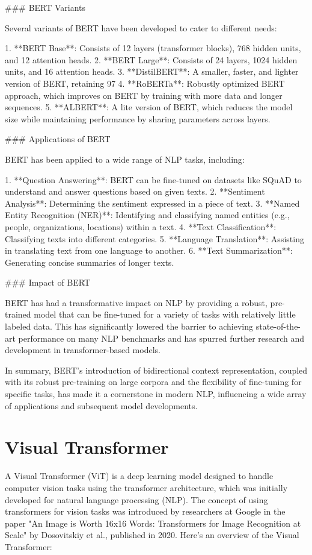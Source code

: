 ### BERT Variants

Several variants of BERT have been developed to cater to different needs:

1. **BERT Base**: Consists of 12 layers (transformer blocks), 768 hidden units, and 12 attention heads.
2. **BERT Large**: Consists of 24 layers, 1024 hidden units, and 16 attention heads.
3. **DistilBERT**: A smaller, faster, and lighter version of BERT, retaining 97%
4. **RoBERTa**: Robustly optimized BERT approach, which improves on BERT by training with more data and longer sequences.
5. **ALBERT**: A lite version of BERT, which reduces the model size while maintaining performance by sharing parameters across layers.

### Applications of BERT

BERT has been applied to a wide range of NLP tasks, including:

1. **Question Answering**: BERT can be fine-tuned on datasets like SQuAD to understand and answer questions based on given texts.
2. **Sentiment Analysis**: Determining the sentiment expressed in a piece of text.
3. **Named Entity Recognition (NER)**: Identifying and classifying named entities (e.g., people, organizations, locations) within a text.
4. **Text Classification**: Classifying texts into different categories.
5. **Language Translation**: Assisting in translating text from one language to another.
6. **Text Summarization**: Generating concise summaries of longer texts.

### Impact of BERT

BERT has had a transformative impact on NLP by providing a robust, pre-trained model that can be fine-tuned for a variety of tasks with relatively little labeled data. This has significantly lowered the barrier to achieving state-of-the-art performance on many NLP benchmarks and has spurred further research and development in transformer-based models.

In summary, BERT's introduction of bidirectional context representation, coupled with its robust pre-training on large corpora and the flexibility of fine-tuning for specific tasks, has made it a cornerstone in modern NLP, influencing a wide array of applications and subsequent model developments.


\section{Visual Transformer}
A Visual Transformer (ViT) is a deep learning model designed to handle computer vision tasks using the transformer architecture, which was initially developed for natural language processing (NLP). The concept of using transformers for vision tasks was introduced by researchers at Google in the paper "An Image is Worth 16x16 Words: Transformers for Image Recognition at Scale" by Dosovitskiy et al., published in 2020. Here’s an overview of the Visual Transformer:

